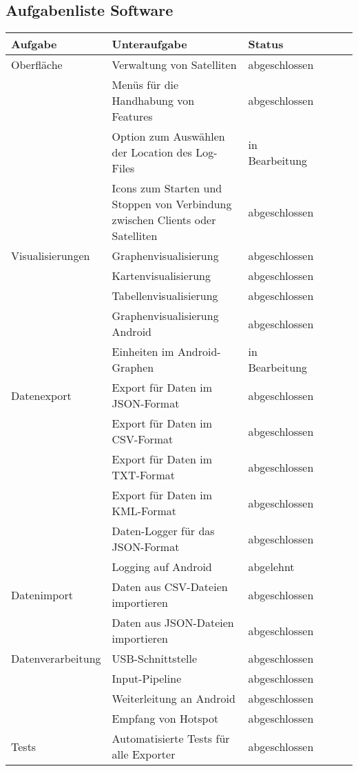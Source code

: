 \subsection{Aufgabenliste Software}
\begin{table}[H]
  \centering
    \begin{tabular}{p{3cm}p{7cm}p{3cm}rrr}
    \toprule
    \textbf{Aufgabe} & \textbf{Unteraufgabe} & \textbf{Status} \\
	\midrule
	Oberfläche & Verwaltung von Satelliten & abgeschlossen \\
	& Menüs für die Handhabung von Features & abgeschlossen\\
	& Option zum Auswählen der Location des Log-Files & in Bearbeitung\\
	& Icons zum Starten und Stoppen von Verbindung zwischen Clients oder Satelliten & abgeschlossen \\	
	\midrule
	Visualisierungen & Graphenvisualisierung & abgeschlossen \\
	& Kartenvisualisierung & abgeschlossen \\
	& Tabellenvisualisierung & abgeschlossen \\
  & Graphenvisualisierung Android & abgeschlossen \\
  & Einheiten im Android-Graphen & in Bearbeitung \\
	\midrule
	Datenexport & Export für Daten im JSON-Format & abgeschlossen \\
	& Export für Daten im CSV-Format & abgeschlossen \\
	& Export für Daten im TXT-Format & abgeschlossen \\
	& Export für Daten im KML-Format & abgeschlossen \\
	& Daten-Logger für das JSON-Format & abgeschlossen \\
  & Logging auf Android & abgelehnt \\
	\midrule
	Datenimport & Daten aus CSV-Dateien importieren & abgeschlossen \\
	& Daten aus JSON-Dateien importieren & abgeschlossen \\
	\midrule
	Datenverarbeitung & USB-Schnittstelle & abgeschlossen \\
	& Input-Pipeline & abgeschlossen \\
  & Weiterleitung an Android & abgeschlossen \\
  & Empfang von Hotspot & abgeschlossen \\
	\midrule
	Tests & Automatisierte Tests für alle Exporter & abgeschlossen \\

\end{tabular}
\end{table}
